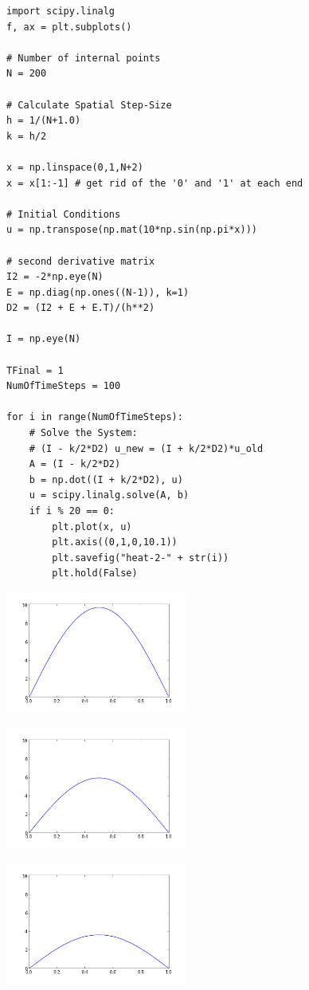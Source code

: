 \documentclass[12pt,fleqn]{article}\usepackage{../common}
\begin{document}
\begin{verbatim}
import scipy.linalg
f, ax = plt.subplots()

# Number of internal points
N = 200

# Calculate Spatial Step-Size
h = 1/(N+1.0)
k = h/2

x = np.linspace(0,1,N+2)
x = x[1:-1] # get rid of the '0' and '1' at each end

# Initial Conditions
u = np.transpose(np.mat(10*np.sin(np.pi*x)))

# second derivative matrix
I2 = -2*np.eye(N)
E = np.diag(np.ones((N-1)), k=1)
D2 = (I2 + E + E.T)/(h**2)

I = np.eye(N)

TFinal = 1
NumOfTimeSteps = 100

for i in range(NumOfTimeSteps):
    # Solve the System: 
    # (I - k/2*D2) u_new = (I + k/2*D2)*u_old
    A = (I - k/2*D2)
    b = np.dot((I + k/2*D2), u)
    u = scipy.linalg.solve(A, b)
    if i % 20 == 0:
        plt.plot(x, u)
        plt.axis((0,1,0,10.1))
        plt.savefig("heat-2-" + str(i))
        plt.hold(False)
\end{verbatim}

\includegraphics[height=4cm]{heat-2-0.png}

\includegraphics[height=4cm]{heat-2-20.png}

\includegraphics[height=4cm]{heat-2-40.png}
\end{document}
